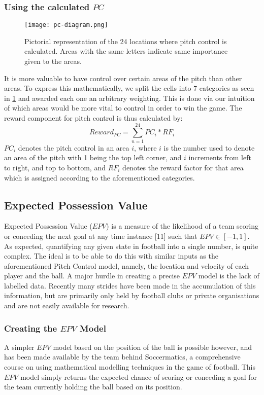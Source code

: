 \documentclass[11pt]{article}
\begin{document}
\subsubsection{Using the calculated $PC$}
\begin{figure}[!h]
    \centering
    \texttt{[image: pc-diagram.png]}
    \caption{Pictorial representation of the 24 locations where pitch control is calculated. Areas with the same letters indicate same importance given to the areas.}
    \label{fig:pc-diagram}
\end{figure}

It is more valuable to have control over certain areas of the pitch than other areas. To express this mathematically, we split the cells into 7 categories as seen in \ref{fig:pc-diagram} and awarded each one an arbitrary weighting. This is done via our intuition of which areas would be more vital to control in order to win the game.
The reward component for pitch control is thus calculated by:
\begin{equation}
    Reward_{PC} = \sum_{n=1}^{24}   PC_i * RF_i
\end{equation}
$PC_i$ denotes the pitch control in an area $i$, where $i$ is the number used to denote an area of the pitch with 1 being the top left corner, and $i$ increments from left to right, and top to bottom, and $RF_i$ denotes the reward factor for that area which is assigned according to the aforementioned categories.

\subsection{Expected Possession Value}


Expected Possession Value ($EPV$) is a measure of the likelihood of a team scoring or conceding the next goal at any time instance [11] such that  $EPV \in  [-1, 1] $. As expected, quantifying any given state in football into a single number, is quite complex. The ideal is to be able to do this with similar inputs as the aforementioned Pitch Control model, namely, the location and velocity of each player and the ball. A major hurdle in creating a precise $EPV$ model is the lack of labelled data. Recently many strides have been made in the accumulation of this information, but are primarily only held by football clubs or private organisations and are not easily available for research.

\subsubsection{Creating the $EPV$ Model}
A simpler $EPV$ model based on the position of the ball is possible however, and
has been made available by the team behind Soccermatics, a comprehensive course on using mathematical modelling techniques in the game of football. This $EPV$ model simply returns the expected chance of scoring or conceding a goal for the team currently holding the ball based on its position.
\end{document}
